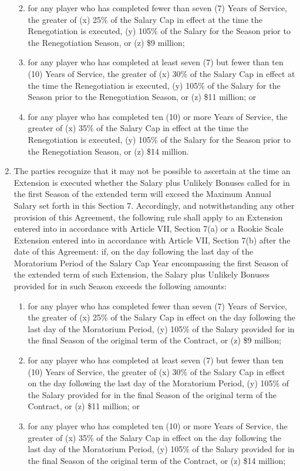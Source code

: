 \documentclass[
]{book}
\providecommand{\tightlist}{%
  \setlength{\itemsep}{0pt}\setlength{\parskip}{0pt}}
\begin{document}
\begin{enumerate}
  \begin{enumerate}
  \def\labelenumii{(\roman{enumii})}
  \tightlist
  \item
    for any player who has completed fewer than seven (7) Years of Service, the greater of (x) 25\% of the Salary Cap in effect at the time the Renegotiation is executed, (y) 105\% of the Salary for the Season prior to the Renegotiation Season, or (z) \$9 million;
  \item
    for any player who has completed at least seven (7) but fewer than ten (10) Years of Service, the greater of (x) 30\% of the Salary Cap in effect at the time the Renegotiation is executed, (y) 105\% of the Salary for the Season prior to the Renegotiation Season, or (z) \$11 million; or
  \item
    for any player who has completed ten (10) or more Years of Service, the greater of (x) 35\% of the Salary Cap in effect at the time the Renegotiation is executed, (y) 105\% of the Salary for the Season prior to the Renegotiation Season, or (z) \$14 million.
  \end{enumerate}
\item
  The parties recognize that it may not be possible to ascertain at the time an Extension is executed whether the Salary plus Unlikely Bonuses called for in the first Season of the extended term will exceed the Maximum Annual Salary set forth in this Section 7. Accordingly, and notwithstanding any other provision of this Agreement, the following rule shall apply to an Extension entered into in accordance with Article VII, Section 7(a) or a Rookie Scale Extension entered into in accordance with Article VII, Section 7(b) after the date of this Agreement: if, on the day following the last day of the Moratorium Period of the Salary Cap Year encompassing the first Season of the extended term of such Extension, the Salary plus Unlikely Bonuses provided for in such Season exceeds the following amounts:

  \begin{enumerate}
  \def\labelenumii{(\roman{enumii})}
  \tightlist
  \item
    for any player who has completed fewer than seven (7) Years of Service, the greater of (x) 25\% of the Salary Cap in effect on the day following the last day of the Moratorium Period, (y) 105\% of the Salary provided for in the final Season of the original term of the Contract, or (z) \$9 million;
  \item
    for any player who has completed at least seven (7) but fewer than ten (10) Years of Service, the greater of (x) 30\% of the Salary Cap in effect on the day following the last day of the Moratorium Period, (y) 105\% of the Salary provided for in the final Season of the original term of the Contract, or (z) \$11 million; or
  \item
    for any player who has completed ten (10) or more Years of Service, the greater of (x) 35\% of the Salary Cap in effect on the day following the last day of the Moratorium Period, (y) 105\% of the Salary provided for in the final Season of the original term of the Contract, or (z) \$14 million;
  \end{enumerate}


\end{enumerate}
\end{document}
